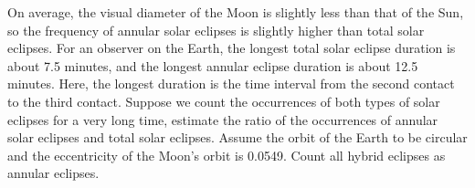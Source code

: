 On average, the visual diameter of the Moon is slightly less than that of the
Sun, so the frequency of annular solar eclipses is slightly higher than total
solar eclipses. For an observer on the Earth, the longest total solar eclipse
duration is about 7.5 minutes, and the longest annular eclipse duration is
about 12.5 minutes. Here, the longest duration is the time interval from the
second contact to the third contact. Suppose we count the occurrences of both
types of solar eclipses for a very long time, estimate the ratio of the
occurrences of annular solar eclipses and total solar eclipses. Assume the
orbit of the Earth to be circular and the eccentricity of the Moon's orbit is
0.0549. Count all hybrid eclipses as annular eclipses.
